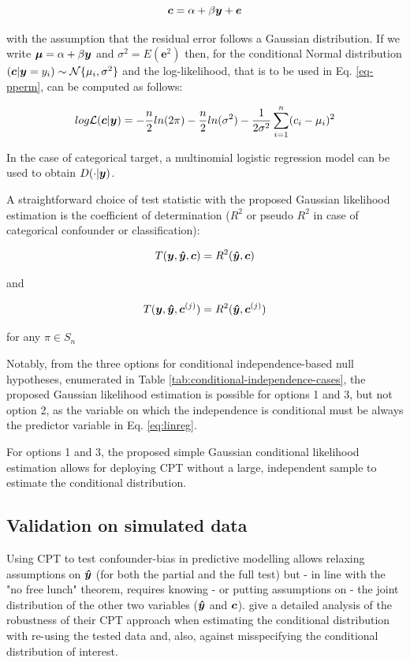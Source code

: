 \documentclass{article}
\begin{document}
\begin{equation}
    \label{eq:linreg}
    \boldsymbol{c} = \alpha + \beta \boldsymbol{y} + \boldsymbol{e}
\end{equation}


with the assumption that the residual error follows a Gaussian distribution. If we write $\boldsymbol{\mu} = \alpha + \beta \boldsymbol{y}$ and $\sigma^2 = E(\boldsymbol{e}^2)$ then, for the conditional Normal distribution $ (\boldsymbol{c}|\boldsymbol{y}=y_i) \sim \mathcal{N}\{\mu_i, \sigma^2\}$ and the log-likelihood, that is to be used in Eq. \ref{eq-pperm}, can be computed as follows:

$$ log\mathcal{L}(\boldsymbol{c}|\boldsymbol{y}) = - \frac{n}{2} ln(2 \pi) -  \frac{n}{2} ln( \sigma^2) - \frac{1}{2 \sigma^2} \sum_{i=1}^n (c_i - \mu_i)^2 $$

In the case of categorical target, a multinomial logistic regression model can be used to obtain $D(\cdot|\boldsymbol{y})$.

A straightforward choice of test statistic with the proposed Gaussian likelihood estimation is the coefficient of determination ($R^2$ or pseudo $R^2$ in case of categorical confounder or classification):

$$T(\boldsymbol{y}, \boldsymbol{\hat{y}}, \boldsymbol{c}) = R^2(\boldsymbol{\hat{y}}, \boldsymbol{c})$$ 

and

$$T(\boldsymbol{y}, \boldsymbol{\hat{y}}, \boldsymbol{c}^{(j)}) = R^2(\boldsymbol{\hat{y}}, \boldsymbol{c}^{(j)})$$ 

for any $\pi \in S_n$

Notably, from the three options for conditional independence-based null hypotheses, enumerated in Table \ref{tab:conditional-independence-cases}, the proposed Gaussian likelihood estimation is possible for options 1 and 3, but not option 2, as the variable on which the independence is conditional must be always the predictor variable in Eq. \ref{eq:linreg}.

For options 1 and 3, the proposed simple Gaussian conditional likelihood estimation allows for deploying CPT without a large, independent sample to estimate the conditional distribution. 


\subsection{Validation on simulated data}

Using CPT to test confounder-bias in predictive modelling allows relaxing assumptions on $\boldsymbol{\hat{y}}$ (for both the partial and the full test) but - in line with the "no free lunch" theorem, requires knowing - or putting assumptions on - the joint distribution of the other two variables ($\boldsymbol{\hat{y}}$ and $\boldsymbol{c}$). 
\cite{berrett2020conditional} give a detailed analysis of the robustness of their CPT approach when estimating the conditional distribution with re-using the tested data and, also, against misspecifying the conditional distribution of interest.
\end{document}
